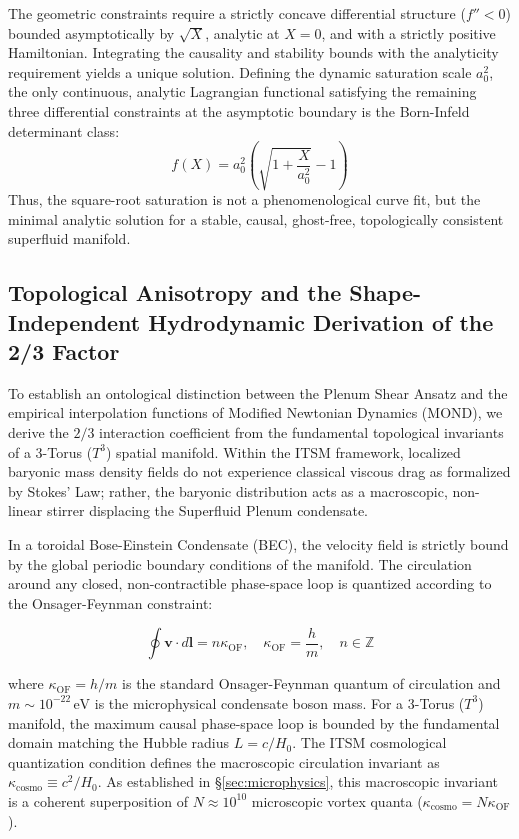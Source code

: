 \documentclass[aps,prd,10pt,twocolumn,superscriptaddress,nofootinbib,floatfix]{revtex4-2}
\begin{document}
The geometric constraints require a strictly concave differential structure ($f'' < 0$) bounded asymptotically by $\sqrt{X}$, analytic at $X=0$, and with a strictly positive Hamiltonian. Integrating the causality and stability bounds with the analyticity requirement yields a unique solution. Defining the dynamic saturation scale $a_0^2$, the only continuous, analytic Lagrangian functional satisfying the remaining three differential constraints at the asymptotic boundary is the Born-Infeld determinant class:
\begin{equation}
f(X) = a_0^2 \left(\sqrt{1+\frac{X}{a_0^2}} - 1\right)
\end{equation}
Thus, the square-root saturation is not a phenomenological curve fit, but the minimal analytic solution for a stable, causal, ghost-free, topologically consistent superfluid manifold.
\subsection{\label{sec:projection}Topological Anisotropy and the Shape-Independent Hydrodynamic Derivation of the 2/3 Factor}

To establish an ontological distinction between the Plenum Shear Ansatz and the empirical interpolation functions of Modified Newtonian Dynamics (MOND), we derive the $2/3$ interaction coefficient from the fundamental topological invariants of a 3-Torus ($T^3$) spatial manifold. Within the ITSM framework, localized baryonic mass density fields do not experience classical viscous drag as formalized by Stokes' Law; rather, the baryonic distribution acts as a macroscopic, non-linear stirrer displacing the Superfluid Plenum condensate.

In a toroidal Bose-Einstein Condensate (BEC), the velocity field is strictly bound by the global periodic boundary conditions of the manifold. The circulation around any closed, non-contractible phase-space loop is quantized according to the Onsager-Feynman constraint:

\begin{equation}
\oint \mathbf{v} \cdot d\mathbf{l} = n \kappa_{\text{OF}}, \quad \kappa_{\text{OF}} = \frac{h}{m}, \quad n \in \mathbb{Z}
\end{equation}

where $\kappa_{\text{OF}} = h/m$ is the standard Onsager-Feynman quantum of circulation and $m \sim 10^{-22}\,\text{eV}$ is the microphysical condensate boson mass. For a 3-Torus ($T^3$) manifold, the maximum causal phase-space loop is bounded by the fundamental domain matching the Hubble radius $L = c/H_0$. The ITSM cosmological quantization condition defines the macroscopic circulation invariant as $\kappa_{\text{cosmo}} \equiv c^2 / H_0$. As established in \S\ref{sec:microphysics}, this macroscopic invariant is a coherent superposition of $N \approx 10^{10}$ microscopic vortex quanta ($\kappa_{\text{cosmo}} = N \kappa_{\text{OF}}$). 
\end{document}
